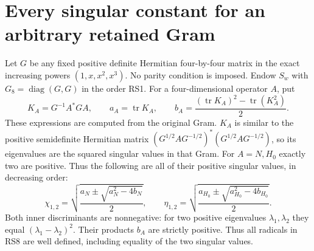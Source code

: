 \documentclass[11pt]{article}
\newcommand{\diag}{\operatorname{diag}}
\newcommand{\tr}{\operatorname{tr}}
\begin{document}
\section{Every singular constant for an arbitrary retained Gram}
Let $G$ be any fixed positive definite Hermitian four-by-four
matrix in the exact increasing powers $(1,x,x^2,x^3)$.
No parity condition is imposed. Endow $S_w$ with
$G_8=\diag(G,G)$ in the order RS1. For a four-dimensional
operator $A$, put
\begin{equation}
 K_A=G^{-1}A^*GA,\qquad
 a_A=\tr K_A,\qquad
 b_A=\frac{(\tr K_A)^2-\tr(K_A^2)}2.
 \tag{RS7}
\end{equation}
These expressions are computed from the original Gram.
$K_A$ is similar to the positive semidefinite Hermitian matrix
$(G^{1/2}AG^{-1/2})^*(G^{1/2}AG^{-1/2})$, so its eigenvalues
are the squared singular values in that Gram. For $A=N,H_0$
exactly two are positive. Thus the following are all of their
positive singular values, in decreasing order:
\begin{equation}
 \chi_{1,2}=
 \sqrt{\frac{a_N\pm\sqrt{a_N^2-4b_N}}2},\qquad
 \eta_{1,2}=
 \sqrt{\frac{a_{H_0}\pm\sqrt{a_{H_0}^2-4b_{H_0}}}2}.
 \tag{RS8}
\end{equation}
Both inner discriminants are nonnegative: for two positive
eigenvalues $\lambda_1,\lambda_2$ they equal
$(\lambda_1-\lambda_2)^2$. Their products $b_A$ are strictly
positive. Thus all radicals in RS8 are well defined, including
equality of the two singular values.
\end{document}

